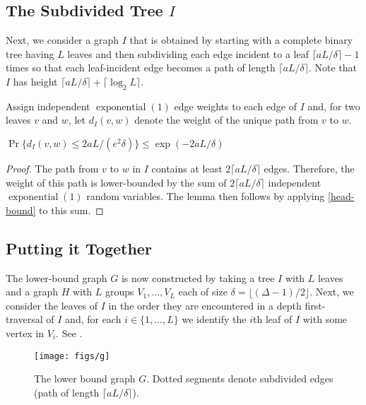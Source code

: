 \documentclass[lotsofwhite]{patmorin}
\DeclareMathOperator{\exponential}{exponential}
\begin{document}
\subsection{The Subdivided Tree $I$}

Next, we consider a graph $I$ that is obtained by starting with a complete
binary tree having $L$ leaves and then subdividing each edge incident
to a leaf $\lceil aL/\delta\rceil-1$ times so that each leaf-incident
edge becomes a path of length $\lceil aL/\delta\rceil$.  Note that $I$
has height $\lceil aL/\delta\rceil+\lceil\log_2 L\rceil$.

Assign independent $\exponential(1)$ edge weights to each edge of $I$
and, for two leaves $v$ and $w$, let $d_I(v,w)$ denote the weight of
the unique path from $v$ to $w$.

\begin{lem}
   $\Pr\{d_I(v,w) \le 2aL/(e^2\delta)\} \le \exp(-2aL/\delta)$
\end{lem}

\begin{proof}
  The path from $v$ to $w$ in $I$ contains at least $2\lceil
  aL/\delta\rceil$ edges.  Therefore, the weight of this path is
  lower-bounded by the sum of $2\lceil aL/\delta\rceil$ independent
  $\exponential(1)$ random variables.  The lemma then follows by applying
  \eqref{head-bound} to this sum.
\end{proof}


\subsection{Putting it Together}

The lower-bound graph $G$ is now constructed by taking a tree $I$ with
$L$ leaves and a graph $H$ with $L$ groups $V_1,\ldots,V_L$ each of size
$\delta=\lfloor(\Delta-1)/2\rfloor$.  Next, we consider the leaves of
$I$ in the order they are encountered in a depth first-traversal of $I$
and, for each $i\in\{1,\ldots,L\}$ we identify the $i$th leaf of $I$
with some vertex in $V_i$.  See .

\begin{figure}
  \begin{center}
    \texttt{[image: figs/g]}
  \end{center}
  \caption{The lower bound graph $G$. Dotted segments denote subdivided edges (path of length $\lceil aL/\delta\rceil$).}
\end{figure}
\end{document}
